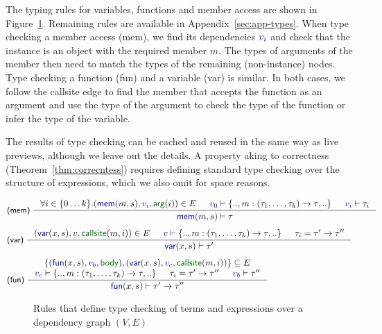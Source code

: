 \documentclass[acmsmall,anonymous,fleqn]{acmart}\settopmatter{printfolios=false,printccs=false,printacmref=false}
\theoremstyle{plain}
\theoremstyle{definition}
\newcommand{\bndclr}[1]{\textcolor{kvdclr}{#1}}
\newcommand{\bnd}[1]{\textnormal{\textcolor{kvdclr}{\sffamily #1}}}
\newcommand{\blbl}[1]{\textnormal{\textcolor{numclr}{\sffamily #1}}}
\newcommand{\rname}[1]{{\sffamily\small(#1)}}
\begin{document}
The typing rules for variables, functions and member access are shown in Figure~\ref{fig:tc}.
Remaining rules are available in Appendix~\ref{sec:app-types}.
When type checking a member access \rname{mem}, we find its dependencies $\bndclr{v_i}$ and
check that the instance is an object with the required member $m$. The types of arguments of the
member then need to match the types of the remaining (non-instance) nodes.
Type checking a function \rname{fun} and a variable \rname{var} is similar. In both cases,
we follow the \blbl{callsite} edge to find the member that accepts the function as an argument
and use the type of the argument to check the type of the function or infer the type of the
variable.

The results of type checking can be cached and reused in the same way as live previews, although
we leave out the details. A property aking to correctness (Theorem~\ref{thm:correcntess})
requires defining standard type checking over the structure of expressions, which we also
omit for space reasons.


\begin{figure}
\begin{equation*}
\hspace{-3.5em}
\begin{array}{l}
\inference[\rname{mem}~]
  { \forall i\in\{0\ldots k\}.(\bnd{mem}(m, s), \bndclr{v_i}, \blbl{arg}(i)) \in E &
  \bndclr{v_0} \vdash \{.., m:(\tau_1, \ldots, \tau_k) \rightarrow \tau, ..\} & \bndclr{v_i} \vdash \tau_i }
  { \bnd{mem}(m, s) \vdash \tau }
\\[1.5em]
\inference[\rname{var}~]
  { (\bnd{var}(x,s), \bndclr{v}, \blbl{callsite}(m, i)) \in E &
    \bndclr{v} \vdash \{.., m:(\tau_1, \ldots, \tau_k)\rightarrow \tau,..\} & \tau_i=\tau'\rightarrow\tau'' }
  { \bnd{var}(x, s) \vdash \tau' }
\\[1.5em]
\inference[\rname{fun}~]
  { \{(\bnd{fun}(x,s), \bndclr{v_b}, \blbl{body}), (\bnd{var}(x,s), \bndclr{v_c}, \blbl{callsite}(m, i))\} \subseteq E \\
    \bndclr{v_c} \vdash \{.., m:(\tau_1, \ldots, \tau_k)\rightarrow \tau,..\} &
    \tau_i=\tau'\rightarrow\tau'' & \bndclr{v_b} \vdash \tau'' }
  { \bnd{fun}(x, s) \vdash \tau' \rightarrow \tau'' }
\end{array}
\end{equation*}
\caption{Rules that define type checking of terms and expressions over a dependency graph $(V, E)$}
\label{fig:tc}
\end{figure}
\end{document}
